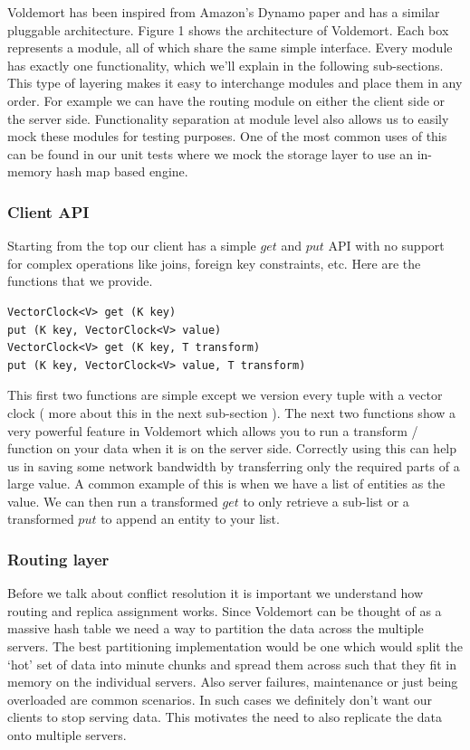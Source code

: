 \documentclass[10pt,twocolumn,preprint,natbib,authoryear]{sigplanconf}
\begin{document}
Voldemort has been inspired from Amazon's Dynamo paper and has a similar pluggable architecture. Figure 1 shows the architecture of Voldemort. Each box represents a module, all of which share the same simple interface. Every module has exactly one functionality, which we'll explain in the following sub-sections. This type of layering makes it easy to interchange modules and place them in any order. For example we can have the routing module on either the client side or the server side. Functionality separation at module level also allows us to easily mock these modules for testing purposes. One of the most common uses of this can be found in our unit tests where we mock the storage layer to use an in-memory hash map based engine. 

\subsubsection {Client API }  
Starting from the top our client has a simple $get$ and $put$ API with no support for complex operations like joins, foreign key constraints, etc. Here are the functions that we provide. 

\scriptsize
\begin{verbatim}
VectorClock<V> get (K key)
put (K key, VectorClock<V> value)
VectorClock<V> get (K key, T transform)
put (K key, VectorClock<V> value, T transform)
\end{verbatim}
\normalsize

This first two functions are simple except we version every tuple with a vector clock ( more about this in the next sub-section ). The next two functions show a very powerful feature in Voldemort which allows you to run a transform / function on your data when it is on the server side. Correctly using this can help us in saving some network bandwidth by transferring only the required parts of a large value. A common example of this is when we have a list of entities as the value. We can then run a transformed $get$ to only retrieve a sub-list or a transformed $put$ to append an entity to your list. 

\subsubsection {Routing layer }  
Before we talk about conflict resolution it is important we understand how routing and replica assignment works. Since Voldemort can be thought of as a massive hash table we need a way to partition the data across the multiple servers. The best partitioning implementation would be one which would split the `hot' set of data into minute chunks and spread them across such that they fit in memory on the individual servers. Also server failures, maintenance or just being overloaded are common scenarios. In such cases we definitely don't want our clients to stop serving data. This motivates the need to also replicate the data onto multiple servers. 
\end{document}

